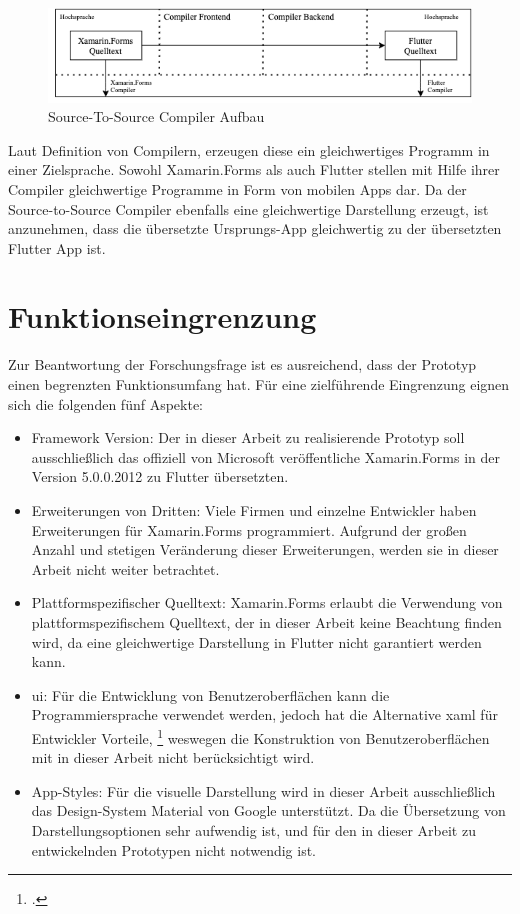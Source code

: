 \begin{figure}[!ht]
 \includegraphics[width=\textwidth,keepaspectratio]{Images/CompilerArchitecture/S2SArchitecture.png}
 \caption{Source-To-Source Compiler Aufbau}
 \label{fig:S2SCompilerAufbau}
\end{figure}

Laut Definition von Compilern, erzeugen diese ein gleichwertiges Programm in einer Zielsprache.  Sowohl Xamarin.Forms als auch Flutter stellen mit Hilfe ihrer Compiler gleichwertige Programme in Form von mobilen Apps dar.  Da der Source-to-Source Compiler ebenfalls eine gleichwertige Darstellung erzeugt, ist anzunehmen, dass die übersetzte Ursprungs-App gleichwertig zu der übersetzten Flutter App ist. 

\section{Funktionseingrenzung}
Zur Beantwortung der Forschungsfrage ist es ausreichend, dass der Prototyp einen begrenzten Funktionsumfang hat.  Für eine zielführende Eingrenzung eignen sich die folgenden fünf Aspekte:

\begin{itemize}
\setlength\itemsep{-0.6em}
 \item Framework Version: Der in dieser Arbeit zu realisierende Prototyp soll ausschließlich das offiziell von Microsoft veröffentliche Xamarin.Forms in der Version 5.0.0.2012 zu Flutter übersetzten.  
 \item Erweiterungen von Dritten: Viele Firmen und einzelne Entwickler haben Erweiterungen für Xamarin.Forms programmiert.  Aufgrund der großen Anzahl und stetigen Veränderung dieser Erweiterungen, werden sie in dieser Arbeit nicht weiter betrachtet.  
 \item Plattformspezifischer Quelltext: Xamarin.Forms erlaubt die Verwendung von plattformspezifischem Quelltext,  der in dieser Arbeit keine Beachtung finden wird, da eine gleichwertige Darstellung in Flutter nicht garantiert werden kann. 
  \item \ac{ui}: Für die Entwicklung von Benutzeroberflächen kann die Programmiersprache \Csharp verwendet werden,  jedoch hat die Alternative \ac{xaml} für Entwickler Vorteile, \footcite[Vgl.][Abgerufen am \today]{MicrosoftXAML2017} weswegen die Konstruktion von Benutzeroberflächen mit \Csharp in dieser Arbeit nicht berücksichtigt wird.  
  \item App-Styles: Für die visuelle Darstellung wird in dieser Arbeit ausschließlich das Design-System Material von Google unterstützt.  Da die Übersetzung von Darstellungsoptionen sehr aufwendig ist,  und für den in dieser Arbeit zu entwickelnden Prototypen nicht notwendig ist.  
\end{itemize}

